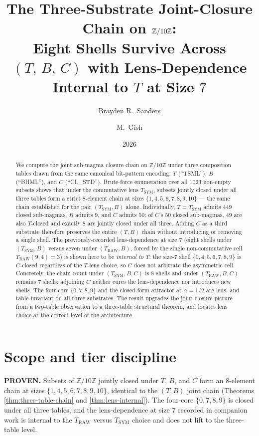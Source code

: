 \documentclass[11pt,reqno]{amsart}
\title[Three-substrate chain on $\Z/10\Z$]
  {The Three-Substrate Joint-Closure Chain on $\Z/10\Z$:\\
   Eight Shells Survive Across $(T,\,B,\,C)$ with
   Lens-Dependence Internal to $T$ at Size $7$}
\author{Brayden R.\ Sanders}
\author{M.\ Gish}
\date{2026}
\theoremstyle{definition}
\newcommand{\Z}{\mathbb{Z}}
\newcommand{\TRAW}{T_{\mathrm{RAW}}}
\newcommand{\TSYM}{T_{\mathrm{SYM}}}
\begin{document}
\begin{abstract}
We compute the joint sub-magma closure chain on $\Z/10\Z$ under
three composition tables drawn from the same canonical bit-pattern
encoding: $T$ (``TSML''), $B$ (``BHML''), and $C$ (``CL\_STD'').
Brute-force enumeration over all $1023$ non-empty subsets shows
that under the commutative lens $\TSYM$, subsets jointly closed
under all three tables form a strict $8$-element chain at sizes
$\{1,4,5,6,7,8,9,10\}$ — the same chain established for the pair
$(\TSYM, B)$ alone. Individually, $T = \TSYM$ admits $449$ closed
sub-magmas, $B$ admits $9$, and $C$ admits $50$; of $C$'s $50$
closed sub-magmas, $49$ are also $T$-closed and exactly $8$ are
jointly closed under all three. Adding $C$ as a third substrate
therefore preserves the entire $(T, B)$ chain without introducing
or removing a single shell. The previously-recorded lens-dependence
at size $7$ (eight shells under $(\TSYM, B)$ versus seven under
$(\TRAW, B)$, forced by the single non-commutative cell
$\TRAW(9,4)=3$) is shown here to be \emph{internal to $T$}: the
size-$7$ shell $\{0,4,5,6,7,8,9\}$ is $C$-closed regardless of the
$T$-lens choice, so $C$ does not arbitrate the asymmetric cell.
Concretely, the chain count under $(\TSYM, B, C)$ is $8$ shells
and under $(\TRAW, B, C)$ remains $7$ shells: adjoining $C$
neither cures the lens-dependence nor introduces new shells. The
four-core $\{0,7,8,9\}$ and the closed-form attractor at
$\alpha=1/2$ are lens- and table-invariant on all three
substrates. The result upgrades the joint-closure picture from a
two-table observation to a three-table structural theorem, and
locates lens choice at the correct level of the architecture.
\end{abstract}

\maketitle

\section*{Scope and tier discipline}

\textbf{PROVEN.} Subsets of $\Z/10\Z$ jointly closed under
$T$, $B$, and $C$ form an $8$-element chain at sizes
$\{1,4,5,6,7,8,9,10\}$, identical to the $(T,B)$ joint chain
(Theorems \ref{thm:three-table-chain} and
\ref{thm:lens-internal}). The four-core $\{0,7,8,9\}$ is closed
under all three tables, and the lens-dependence at size $7$
recorded in companion work is internal to the $T_{\mathrm{RAW}}$
versus $T_{\mathrm{SYM}}$ choice and does not lift to the
three-table level.
\end{document}
